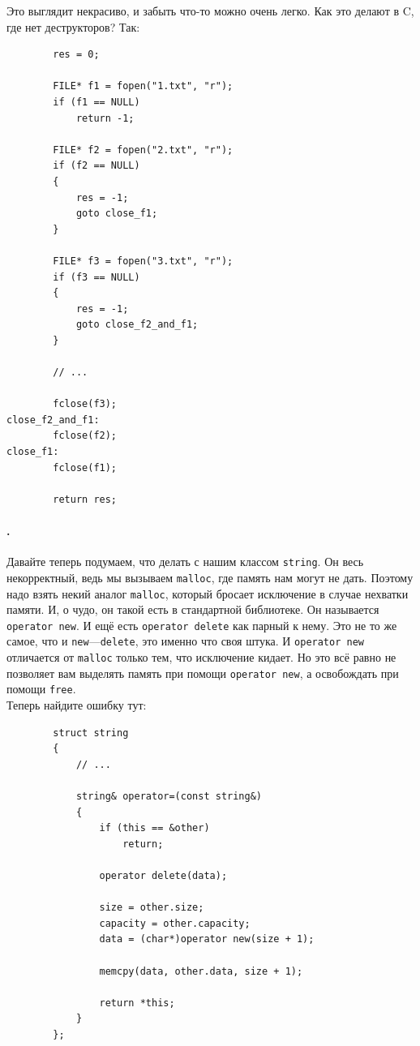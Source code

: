 \documentclass{article}
\begin{document}
    Это выглядит некрасиво, и забыть что-то можно очень легко. Как это делают в C, где нет деструкторов? Так:
    \begin{verbatim}
        res = 0;

        FILE* f1 = fopen("1.txt", "r");
        if (f1 == NULL)
            return -1;
        
        FILE* f2 = fopen("2.txt", "r");
        if (f2 == NULL)
        {
            res = -1;
            goto close_f1;
        }
        
        FILE* f3 = fopen("3.txt", "r");
        if (f3 == NULL)
        {
            res = -1;
            goto close_f2_and_f1;
        }
        
        // ...
        
        fclose(f3);
close_f2_and_f1:
        fclose(f2);
close_f1:
        fclose(f1);

        return res;
    \end{verbatim}
    \paragraph{.}
    Давайте теперь подумаем, что делать с нашим классом \texttt{string}. Он весь некорректный, ведь мы вызываем \texttt{malloc}, где память нам могут не дать. Поэтому надо взять некий аналог \texttt{malloc}, который бросает исключение в случае нехватки памяти. И, о чудо, он такой есть в стандартной библиотеке. Он называется \texttt{operator new}. И ещё есть \texttt{operator delete} как парный к нему. Это не то же самое, что и \texttt{new}---\texttt{delete}, это именно что своя штука. И \texttt{operator new} отличается от \texttt{malloc} только тем, что исключение кидает. Но это всё равно не позволяет вам выделять память при помощи \texttt{operator new}, а освобождать при помощи \texttt{free}.\\
    Теперь найдите ошибку тут:
    \begin{verbatim}
        struct string
        {
            // ...

            string& operator=(const string&)
            {
                if (this == &other)
                    return;

                operator delete(data);

                size = other.size;
                capacity = other.capacity;
                data = (char*)operator new(size + 1);

                memcpy(data, other.data, size + 1);

                return *this;
            }
        };
    \end{verbatim}
\end{document}
